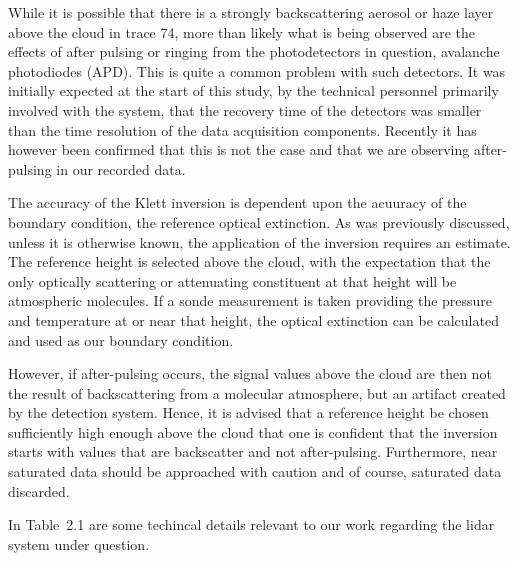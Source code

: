 While it is possible that there is a strongly backscattering
aerosol or haze layer above the cloud in trace 74, more than likely
what is being observed are the effects of after pulsing or ringing
from the photodetectors in question, avalanche photodiodes (APD).
This is quite a common problem with such detectors\cite{jacek}. 
It was initially expected at the start of this study, 
by the technical personnel primarily involved with the system, that
the recovery time of the detectors was smaller than the
time resolution of the data acquisition components. Recently
it has however been confirmed that this is not the case and that
we are observing after-pulsing in our recorded data\cite{evpd}. 

The accuracy of the Klett inversion is dependent upon the acuuracy
of the boundary condition, the reference optical extinction. As was
previously discussed, unless it is otherwise known, the application
of the inversion requires an estimate. The reference height is selected
above the cloud, with the expectation that the only optically scattering or
attenuating constituent at that height will be atmospheric molecules. 
If a sonde measurement is taken providing the pressure and temperature
at or near that height, the optical extinction can be calculated and
used as our boundary condition.

However, if after-pulsing occurs, the signal values above the cloud
are then not the result of backscattering from a molecular atmosphere,
but an artifact created by the detection system.
Hence, it is advised that a reference height be chosen sufficiently
high enough above the cloud that one is confident that the inversion
starts with values that are backscatter and not after-pulsing. 
Furthermore, near saturated data should be approached with caution
and of course, saturated data discarded.
 
In Table~{2.1} are some techincal details relevant to our work regarding
the lidar system under question.

